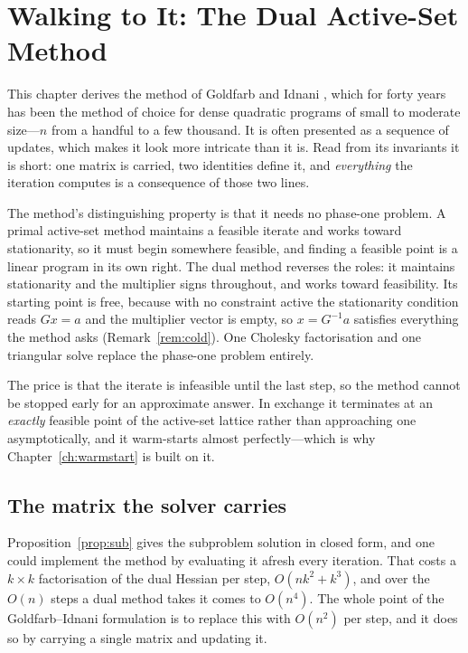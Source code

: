 \chapter{Walking to It: The Dual Active-Set Method}
\label{ch:walking}

This chapter derives the method of Goldfarb and Idnani
\cite{goldfarb1982,goldfarb1983}, which for forty years has been the method of
choice for dense quadratic programs of small to moderate size---$n$ from a handful
to a few thousand. It is often presented as a sequence of updates, which makes it
look more intricate than it is. Read from its invariants it is short: one matrix
is carried, two identities define it, and \emph{everything} the iteration computes
is a consequence of those two lines.

The method's distinguishing property is that it needs no phase-one problem. A
primal active-set method maintains a feasible iterate and works toward
stationarity, so it must begin somewhere feasible, and finding a feasible point is
a linear program in its own right. The dual method reverses the roles: it maintains
stationarity and the multiplier signs throughout, and works toward feasibility.
Its starting point is free, because with no constraint active the stationarity
condition reads $Gx = a$ and the multiplier vector is empty, so
$x = G^{-1}a$ satisfies everything the method asks (Remark~\ref{rem:cold}). One
Cholesky factorisation and one triangular solve replace the phase-one problem
entirely.

The price is that the iterate is infeasible until the last step, so the method
cannot be stopped early for an approximate answer. In exchange it terminates at an
\emph{exactly} feasible point of the active-set lattice rather than approaching one
asymptotically, and it warm-starts almost perfectly---which is why
Chapter~\ref{ch:warmstart} is built on it.

\section{The matrix the solver carries}
\label{sec:factorisation}

Proposition~\ref{prop:sub} gives the subproblem solution in closed form, and one
could implement the method by evaluating it afresh every iteration. That costs a
$k\times k$ factorisation of the dual Hessian per step, $O(nk^2 + k^3)$, and over
the $O(n)$ steps a dual method takes it comes to $O(n^4)$. The whole point of the
Goldfarb--Idnani formulation is to replace this with $O(n^2)$ per step, and it does
so by carrying a single matrix and updating it.

